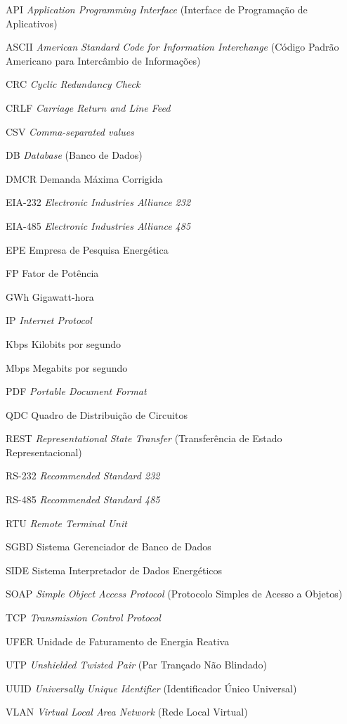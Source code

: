 \begin{siglas}


  \item[API] \textit{Application Programming Interface} (Interface de Programação de Aplicativos)
  \item[ASCII] \textit{American Standard Code for Information Interchange} (Código Padrão Americano para Intercâmbio de Informações)
  \item[CRC] \textit{Cyclic Redundancy Check}
  \item[CRLF] \textit{Carriage Return and Line Feed}
  \item[CSV] \textit{Comma-separated values}
  \item[DB] \textit{Database} (Banco de Dados)
  \item[DMCR] Demanda Máxima Corrigida
  \item[EIA-232] \textit{Electronic Industries Alliance 232}
  \item[EIA-485] \textit{Electronic Industries Alliance 485}
  \item[EPE] Empresa de Pesquisa Energética
  \item[FP] Fator de Potência
  \item[GWh] Gigawatt-hora
  \item[IP] \textit{Internet Protocol}
  \item[Kbps] Kilobits por segundo
  \item[Mbps] Megabits por segundo
  \item[PDF] \textit{Portable Document Format}
  \item[QDC] Quadro de Distribuição de Circuitos
  \item[REST] \textit{Representational State Transfer} (Transferência de Estado Representacional)
  \item[RS-232] \textit{Recommended Standard 232}
  \item[RS-485] \textit{Recommended Standard 485}
  \item[RTU] \textit{Remote Terminal Unit}
  \item[SGBD] Sistema Gerenciador de Banco de Dados
  \item[SIDE] Sistema Interpretador de Dados Energéticos
  \item[SOAP] \textit{Simple Object Access Protocol} (Protocolo Simples de Acesso a Objetos)
  \item[TCP] \textit{Transmission Control Protocol}
  \item[UFER] Unidade de Faturamento de Energia Reativa
  \item[UTP] \textit{Unshielded Twisted Pair} (Par Trançado Não Blindado)
  \item[UUID] \textit{Universally Unique Identifier} (Identificador Único Universal)
  \item[VLAN] \textit{Virtual Local Area Network} (Rede Local Virtual)
  
\end{siglas}